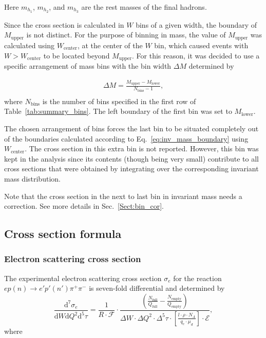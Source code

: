 \documentclass[prc,twocolumn,superscriptaddress,showpacs,amssymb,amsmath,amsfonts,aps,nofootinbib]{revtex4-1}
\begin{document}
Here $m_{h_1}$, $m_{h_2}$, and $m_{h_3}$ are the rest masses of the final hadrons. 


Since the cross section is calculated in $W$ bins of a given width, the boundary of $M_{\text{upper}}$ is not distinct. For the purpose of binning in mass, the value of $M_{\text{upper}}$ was calculated using $W_{\text{center}}$, at the center of the $W$ bin, which caused events with $W > W_{\text{center}}$ to be located beyond $M_{\text{upper}}$. For this reason, it was decided to use a specific arrangement of mass bins with the bin width $\Delta M$ determined by\vspace{-0.25em}

\begin{equation}
\begin{aligned}
\Delta M = \frac{M_{\text{upper}}-M_{\text{lower}}}{N_{\text{bins}}-1}, \\[-10pt]\label{eq:bin_width}
\end{aligned}  
\end{equation} 
where $N_{\text{bins}}$ is the number of bins specified in the first row of Table~\ref{tab:summary_bins}. The left boundary of the first bin was set to $M_{\text{lower}}$.

The chosen arrangement of bins forces the last bin to be situated completely out of the boundaries calculated according to Eq.\!~\eqref{eq:inv_mass_boundary} using $W_{\text{center}}$. The cross section in this extra bin is not reported. However, this bin was kept in the analysis since its contents (though being very small) contribute to all cross sections that were obtained by integrating over the corresponding invariant mass distribution. 


Note that the cross section in the next to last bin in invariant mass needs a correction. See more details in Sec.\!~\ref{Sect:bin_cor}.

\subsection{Cross section formula}
\label{Sect:cr_sect_formula}

\subsubsection{Electron scattering cross section}

The experimental electron scattering cross section $\sigma_{e}$ for the reaction $ep(n) \rightarrow e'p'(n') \pi^{+} \pi^{-}$ is seven-fold differential and determined by\vspace{-0.5em}
\begin{equation}
\frac{\textrm{d}^{7}\sigma_{e}}{\textrm{d}W\textrm{d}Q^{2}\textrm{d}^{5}\tau} = \frac{1}{ R \! \cdot \! \mathcal{F}}  \cdot 
\frac{\left( \frac{N_{\text{full}}}{Q_{\text{full}}}-\frac{N_{\text{empty}}}{Q_{\text{empty}}} \right)}{
\Delta W \! \cdot \! \Delta Q^{2} \! \cdot \! \Delta^{5} \tau \! \cdot \! \left[ \frac{l \cdot \rho \cdot N_{A}}{q_{e}\cdot \mu_{d}} \right]\! \cdot \!\mathcal{E}},
\label{expcrossect}
\end{equation}
where
\end{document}
